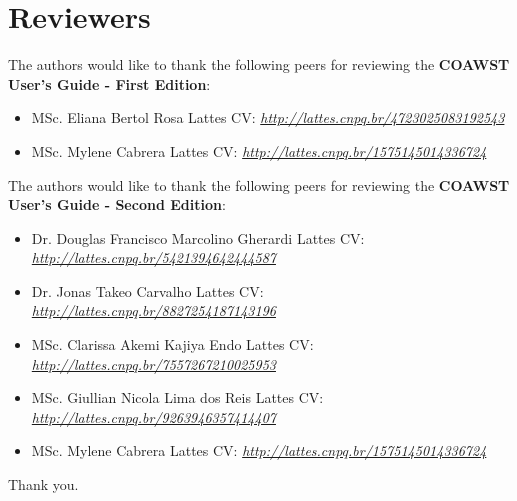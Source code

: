\chapter*{Reviewers}

\bigskip
\noindent The authors would like to thank the following peers for reviewing the \textbf{COAWST User's Guide  - First Edition}:
\bigskip

\begin{itemize}
    \item MSc. Eliana Bertol Rosa \newline Lattes CV: \textit{\textcolor{bleu_cite}{\href{http://lattes.cnpq.br/4723025083192543}{http://lattes.cnpq.br/4723025083192543}}}
    \bigskip
    \item MSc. Mylene Cabrera \newline Lattes CV: \textit{\textcolor{bleu_cite}{\href{http://lattes.cnpq.br/1575145014336724}{http://lattes.cnpq.br/1575145014336724}}}
\end{itemize}

\bigskip
\bigskip
\noindent The authors would like to thank the following peers for reviewing the \textbf{COAWST User's Guide - Second Edition}:
\bigskip

\begin{itemize}
    \item Dr. Douglas Francisco Marcolino Gherardi \newline Lattes CV: \textit{\textcolor{bleu_cite}{\href{http://lattes.cnpq.br/5421394642444587}{http://lattes.cnpq.br/5421394642444587}}}
    \bigskip
    \item Dr. Jonas Takeo Carvalho \newline Lattes CV: \textit{\textcolor{bleu_cite}{\href{http://lattes.cnpq.br/8827254187143196}{http://lattes.cnpq.br/8827254187143196}}}
    \bigskip
    \item MSc. Clarissa Akemi Kajiya Endo \newline Lattes CV: \textit{\textcolor{bleu_cite}{\href{http://lattes.cnpq.br/7557267210025953}{http://lattes.cnpq.br/7557267210025953}}}
    \bigskip
    \item MSc. Giullian Nicola Lima dos Reis \newline Lattes CV: \textit{\textcolor{bleu_cite}{\href{http://lattes.cnpq.br/9263946357414407}{http://lattes.cnpq.br/9263946357414407}}}
    \bigskip
    \item MSc. Mylene Cabrera \newline Lattes CV: \textit{\textcolor{bleu_cite}{\href{http://lattes.cnpq.br/1575145014336724}{http://lattes.cnpq.br/1575145014336724}}}
\end{itemize}
\bigskip
    Thank you. \\
